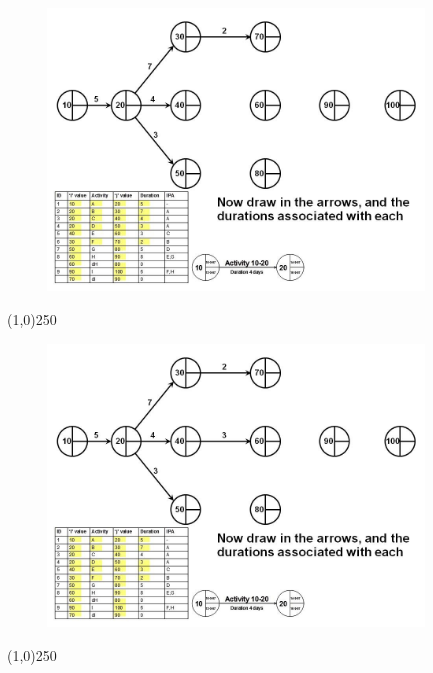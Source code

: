 \begin{frame}
\begin{figure}
	\centering
		\includegraphics[width = 10.0cm]{oldnotes/Slide95.jpg}
\end{figure}
\end{frame}
\begin{center}\line(1,0){250}\end{center}


\begin{frame}
\begin{figure}
	\centering
		\includegraphics[width = 10.0cm]{oldnotes/Slide96.jpg}
\end{figure}
\end{frame}
\begin{center}\line(1,0){250}\end{center}


